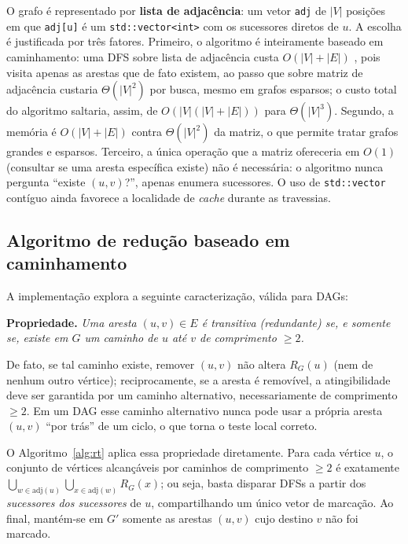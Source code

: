 \documentclass{sbc2023}%
\begin{document}
O grafo é representado por \textbf{lista de adjacência}: um vetor \texttt{adj} de $|V|$ posições em que \texttt{adj[u]} é um \texttt{std::vector<int>} com os sucessores diretos de $u$. A escolha é justificada por três fatores. Primeiro, o algoritmo é inteiramente baseado em caminhamento: uma DFS sobre lista de adjacência custa $O(|V|+|E|)$ \citep{cormen2022}, pois visita apenas as arestas que de fato existem, ao passo que sobre matriz de adjacência custaria $\Theta(|V|^2)$ por busca, mesmo em grafos esparsos; o custo total do algoritmo saltaria, assim, de $O(|V|(|V|+|E|))$ para $\Theta(|V|^3)$. Segundo, a memória é $O(|V|+|E|)$ contra $\Theta(|V|^2)$ da matriz, o que permite tratar grafos grandes e esparsos. Terceiro, a única operação que a matriz ofereceria em $O(1)$ (consultar se uma aresta específica existe) não é necessária: o algoritmo nunca pergunta ``existe $(u,v)$?'', apenas enumera sucessores. O uso de \texttt{std::vector} contíguo ainda favorece a localidade de \emph{cache} durante as travessias.

\subsection{Algoritmo de redução baseado em caminhamento}
\label{sec:alg}

A implementação explora a seguinte caracterização, válida para DAGs:

\medskip
\noindent\textbf{Propriedade.} \emph{Uma aresta $(u,v) \in E$ é transitiva (redundante) se, e somente se, existe em $G$ um caminho de $u$ até $v$ de comprimento $\geq 2$.}
\medskip

De fato, se tal caminho existe, remover $(u,v)$ não altera $R_G(u)$ (nem de nenhum outro vértice); reciprocamente, se a aresta é removível, a atingibilidade deve ser garantida por um caminho alternativo, necessariamente de comprimento $\geq 2$. Em um DAG esse caminho alternativo nunca pode usar a própria aresta $(u,v)$ ``por trás'' de um ciclo, o que torna o teste local correto.

O Algoritmo~\ref{alg:rt} aplica essa propriedade diretamente. Para cada vértice $u$, o conjunto de vértices alcançáveis por caminhos de comprimento $\geq 2$ é exatamente $\bigcup_{w \in \mathrm{adj}(u)} \bigcup_{x \in \mathrm{adj}(w)} R_G(x)$; ou seja, basta disparar DFSs a partir dos \emph{sucessores dos sucessores} de $u$, compartilhando um único vetor de marcação. Ao final, mantém-se em $G'$ somente as arestas $(u,v)$ cujo destino $v$ não foi marcado.
\end{document}
